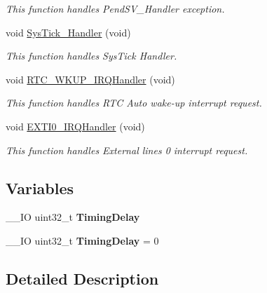 \begin{DoxyCompactItemize}
\begin{DoxyCompactList}\small\item\em This function handles Pend\-S\-V\-\_\-\-Handler exception. \end{DoxyCompactList}\item 
void \hyperlink{group___p_w_r___s_t_o_p_gab5e09814056d617c521549e542639b7e}{Sys\-Tick\-\_\-\-Handler} (void)
\begin{DoxyCompactList}\small\item\em This function handles Sys\-Tick Handler. \end{DoxyCompactList}\item 
void \hyperlink{group___p_w_r___s_t_o_p_ga53a3fe340e323e2fec8d851cd2e83554}{R\-T\-C\-\_\-\-W\-K\-U\-P\-\_\-\-I\-R\-Q\-Handler} (void)
\begin{DoxyCompactList}\small\item\em This function handles R\-T\-C Auto wake-\/up interrupt request. \end{DoxyCompactList}\item 
void \hyperlink{group___p_w_r___s_t_o_p_ga17e9789a29a87d2df54f12b94dd1a0b6}{E\-X\-T\-I0\-\_\-\-I\-R\-Q\-Handler} (void)
\begin{DoxyCompactList}\small\item\em This function handles External lines 0 interrupt request. \end{DoxyCompactList}\end{DoxyCompactItemize}
\subsection*{Variables}
\begin{DoxyCompactItemize}
\item 
\hypertarget{group___p_w_r___s_t_o_p_gaf484abe0ca156dc40cf0fb5e79d4d6db}{\-\_\-\-\_\-\-I\-O uint32\-\_\-t {\bfseries Timing\-Delay}}\label{group___p_w_r___s_t_o_p_gaf484abe0ca156dc40cf0fb5e79d4d6db}

\item 
\hypertarget{group___p_w_r___s_t_o_p_gaf484abe0ca156dc40cf0fb5e79d4d6db}{\-\_\-\-\_\-\-I\-O uint32\-\_\-t {\bfseries Timing\-Delay} = 0}\label{group___p_w_r___s_t_o_p_gaf484abe0ca156dc40cf0fb5e79d4d6db}

\end{DoxyCompactItemize}


\subsection{Detailed Description}


